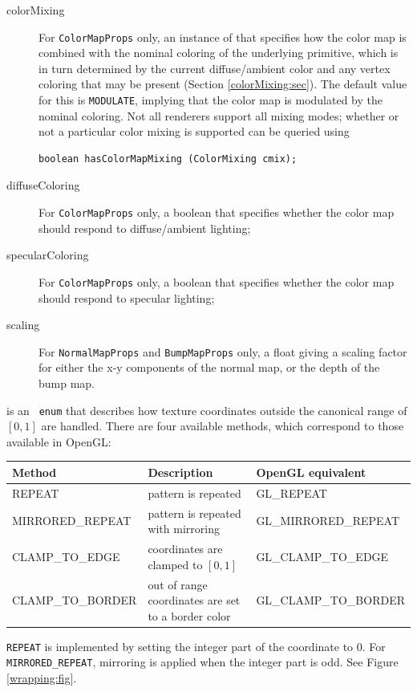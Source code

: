 \begin{description}
\item[colorMixing]\mbox{}

For {\tt ColorMapProps} only, an instance of
 that specifies how
the color map is combined with the nominal coloring of the underlying
primitive, which is in turn determined by the current diffuse/ambient
color and any vertex coloring that may be present (Section
\ref{colorMixing:sec}). The default value for this is {\tt MODULATE},
implying that the color map is modulated by the nominal coloring. Not
all renderers support all mixing modes; whether or not a particular
color mixing is supported can be queried using
%
\begin{lstlisting}[]
   boolean hasColorMapMixing (ColorMixing cmix);
\end{lstlisting}
%

\item[diffuseColoring]\mbox{}

For {\tt ColorMapProps} only, a boolean that specifies
whether the color map should respond to diffuse/ambient lighting;

\item[specularColoring]\mbox{}

For {\tt ColorMapProps} only, a boolean that specifies
whether the color map should respond to specular lighting;

\item[scaling]\mbox{}

For {\tt NormalMapProps} and {\tt BumpMapProps} only, a float giving a
scaling factor for either the x-y components of the normal map, or the
depth of the bump map.

\end{description}

 is an {\tt
enum} that describes how texture coordinates outside the canonical
range of $[0,1]$ are handled. There are four available methods, which
correspond to those available in OpenGL:
%
\begin{center}
\begin{tabular}{|lll|}
\hline
Method & Description & OpenGL equivalent\\
\hline 
REPEAT & pattern is repeated & GL\_REPEAT \\
MIRRORED\_REPEAT & pattern is repeated with mirroring & GL\_MIRRORED\_REPEAT \\
CLAMP\_TO\_EDGE & coordinates are clamped to $[0,1]$ & 
GL\_CLAMP\_TO\_EDGE \\
CLAMP\_TO\_BORDER & out of range coordinates are set to a border color &
GL\_CLAMP\_TO\_BORDER \\
\hline
\end{tabular}
\end{center}
{\tt REPEAT} is implemented by setting the integer part of the
coordinate to 0. For {\tt MIRRORED\_REPEAT}, mirroring is applied when
the integer part is odd. See Figure \ref{wrapping:fig}.

